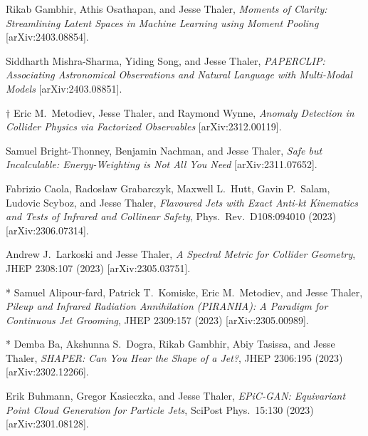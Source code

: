 \setcounter{jessecount}{129}

\begin{list}{[]\addtocounter{jessecount}{-1}}{\leftmargin=3em \itemsep=4pt}

\item
 Rikab Gambhir, Athis Osathapan, and Jesse Thaler,
\emph{Moments of Clarity: Streamlining Latent Spaces in Machine Learning using Moment Pooling}
[arXiv:2403.08854].

\item
 Siddharth Mishra-Sharma, Yiding Song, and Jesse Thaler,
\emph{PAPERCLIP: Associating Astronomical Observations and Natural Language with Multi-Modal Models}
[arXiv:2403.08851].

\item
$\dagger$ Eric M.\ Metodiev, Jesse Thaler, and Raymond Wynne,
\emph{Anomaly Detection in Collider Physics via Factorized Observables}
[arXiv:2312.00119].

\item
 Samuel Bright-Thonney, Benjamin Nachman, and Jesse Thaler,
\emph{Safe but Incalculable: Energy-Weighting is Not All You Need}
[arXiv:2311.07652].

\item
 Fabrizio Caola, Radosław Grabarczyk, Maxwell L.\ Hutt, Gavin P.\ Salam, Ludovic Scyboz, and Jesse Thaler,
\emph{Flavoured Jets with Exact Anti-kt Kinematics and Tests of Infrared and Collinear Safety},
Phys.\ Rev.\ D108:094010 (2023)
[arXiv:2306.07314].

\item
 Andrew J.\ Larkoski and Jesse Thaler,
\emph{A Spectral Metric for Collider Geometry},
JHEP 2308:107 (2023)
[arXiv:2305.03751].

\item
* Samuel Alipour-fard, Patrick T.\ Komiske, Eric M.\ Metodiev, and Jesse Thaler,
\emph{Pileup and Infrared Radiation Annihilation (PIRANHA): A Paradigm for Continuous Jet Grooming},
JHEP 2309:157 (2023)
[arXiv:2305.00989].

\item
* Demba Ba, Akshunna S.\ Dogra, Rikab Gambhir, Abiy Tasissa, and Jesse Thaler,
\emph{SHAPER: Can You Hear the Shape of a Jet?},
JHEP 2306:195 (2023)
[arXiv:2302.12266].

\item
 Erik Buhmann, Gregor Kasieczka, and Jesse Thaler,
\emph{EPiC-GAN: Equivariant Point Cloud Generation for Particle Jets},
SciPost Phys.\ 15:130 (2023)
[arXiv:2301.08128].


\end{list}
